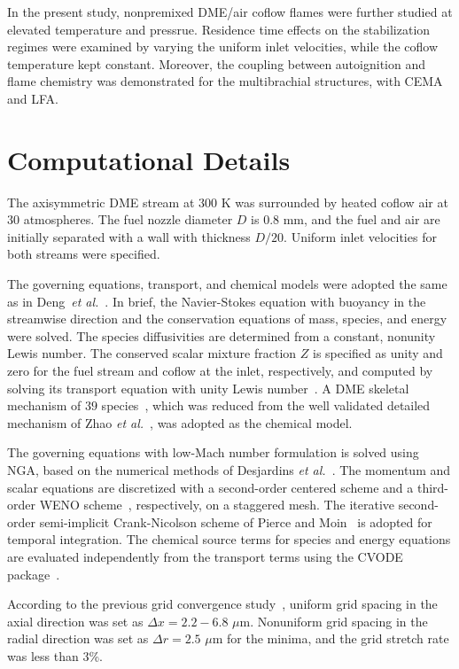 \documentclass{wssci}
\begin{document}
In the present study, nonpremixed DME/air coflow flames were further studied at elevated temperature and pressrue.  Residence time effects on the stabilization regimes were examined by varying the uniform inlet velocities, while the coflow temperature kept constant.  Moreover, the coupling between autoignition and flame chemistry was demonstrated for the multibrachial structures, with CEMA and LFA.                         

\section{Computational Details}

The axisymmetric DME stream at $300$ K was surrounded by heated coflow air at $30$ atmospheres.  The fuel nozzle diameter $D$ is $0.8$ mm, and the fuel and air are initially separated with a wall with thickness $D/20$.  Uniform inlet velocities for both streams were specified.

The governing equations, transport, and chemical models were adopted the same as in Deng~\emph{et al.}~\cite{deng15}.  In brief, the Navier-Stokes equation with buoyancy in the streamwise direction and the conservation equations of mass, species, and energy were solved.  The species diffusivities are determined from a constant, nonunity Lewis number.  The conserved scalar mixture fraction $Z$ is specified as unity and zero for the fuel stream and coflow at the inlet, respectively, and computed by solving its transport equation with unity Lewis number~\cite{pitsch98b}.  A DME skeletal mechanism of $39$ species~\cite{bhagatwala15}, which was reduced from the well validated detailed mechanism of Zhao \emph{et al.}~\cite{zhao08}, was adopted as the chemical model.

The governing equations with low-Mach number formulation is solved using NGA, based on the numerical methods of Desjardins \emph{et al.}~\cite{desjardins08}.  The momentum and scalar equations are discretized with a second-order centered scheme and a third-order WENO scheme~\cite{liu94}, respectively, on a staggered mesh.  The iterative second-order semi-implicit Crank-Nicolson scheme of Pierce and Moin~\cite{pierce01} is adopted for temporal integration.  The chemical source terms for species and energy equations are evaluated independently from the transport terms using the CVODE package~\cite{cohen96}.

According to the previous grid convergence study~\cite{deng15}, uniform grid spacing in the axial direction was set as $\Delta x = 2.2-6.8$ $\mu$m.  Nonuniform grid spacing in the radial direction was set as $\Delta r = 2.5$ $\mu$m for the minima, and the grid stretch rate was less than $3$\%.    
\end{document}
